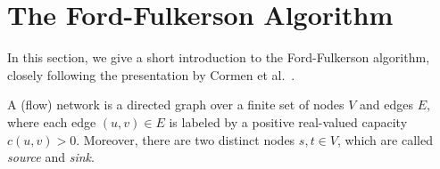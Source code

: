\documentclass[smallcondensed]{svjour3}     %
\begin{document}
\section{The Ford-Fulkerson Algorithm}\label{sec:background}
%       
%   
% 
%         
%   
%   
%   
%   
%   

In this section, we give a short introduction to the Ford-Fulkerson algorithm, closely following the presentation by Cormen et al.~\cite{CLRS09}.

% 

A (flow) network is a directed graph over a finite set of nodes $V$ and edges $E$, where each edge $(u,v)\in E$ is labeled by a positive real-valued capacity $c(u,v)>0$.
Moreover, there are two distinct nodes $s,t\in V$, which are called \emph{source} and \emph{sink}. 
\end{document}

